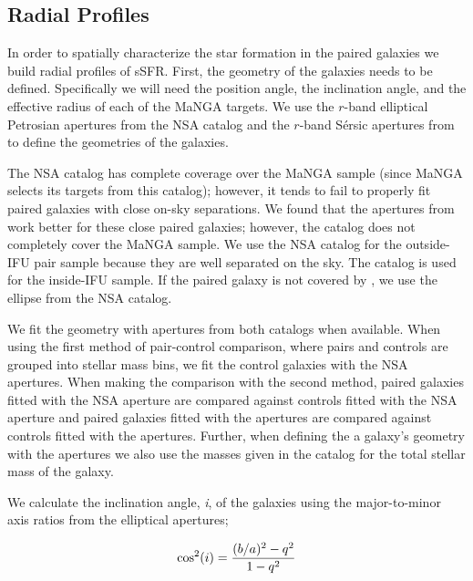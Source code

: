 \documentclass[iop,revtex4,twocolumn,apj,numberedappendix,appendixfloats]{emulateapj}
\begin{document}
\subsection{Radial Profiles}\label{sec:radial}

In order to spatially characterize the star formation in the paired galaxies we build radial profiles of sSFR. First, the geometry of the galaxies needs to be defined. Specifically we will need the position angle, the inclination angle, and the effective radius of each of the MaNGA targets. We use the $r$-band elliptical Petrosian apertures from the NSA catalog and the $r$-band S\'ersic apertures from \citet{Simard:2011} to define the geometries of the galaxies. 

The NSA catalog has complete coverage over the MaNGA sample (since MaNGA selects its targets from this catalog); however, it tends to fail to properly fit paired galaxies with close on-sky separations. We found that the apertures from \citet{Simard:2011} work better for these close paired galaxies; however, the catalog does not completely cover the MaNGA sample. We use the NSA catalog for the outside-IFU pair sample because they are well separated on the sky. The \citet{Simard:2011} catalog is used for the inside-IFU sample. If the paired galaxy is not covered by \citet{Simard:2011}, we use the ellipse from the NSA catalog. 

We fit the geometry with apertures from both catalogs when available. When using the first method of pair-control comparison, where pairs and controls are grouped into stellar mass bins, we fit the control galaxies with the NSA apertures. When making the comparison with the second method, paired galaxies fitted with the NSA aperture are compared against controls fitted with the NSA aperture and paired galaxies fitted with the \citet{Simard:2011} apertures are compared against controls fitted with the \citet{Simard:2011} apertures. Further, when defining the a galaxy's geometry with the \citet{Simard:2011} apertures we also use the masses given in the catalog for the total stellar mass of the galaxy.



We calculate the inclination angle, {\it i}, of the galaxies using the major-to-minor axis ratios from the elliptical apertures;

\begin{equation}
{\rm cos^2}(i) = \frac{(b/a)^2 - q^2}{1 - q^2}
\end{equation}
\end{document}
